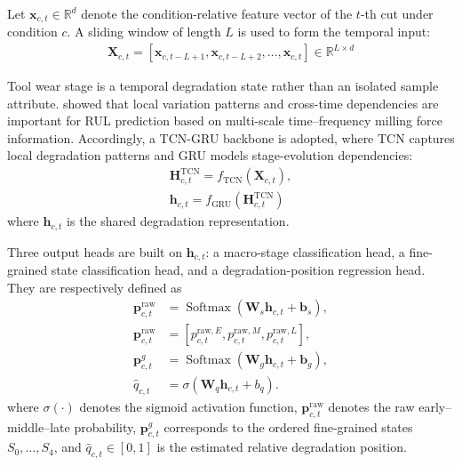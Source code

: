 \documentclass[a4paper,fleqn]{cas-sc}
\begin{document}
  Let $\mathbf{x}_{c,t}\in \mathbb{R}^{d}$ denote the condition-relative feature vector of the $t$-th cut under condition $c$. A sliding window of length $L$ is used to form the temporal input:
  \begin{equation}
    \begin{aligned}
      \mathbf{X}_{c,t}=[\mathbf{x}_{c,t-L+1},\mathbf{x}_{c,t-L+2},\ldots,\mathbf{x}_{c,t}]\in \mathbb{R}^{L\times d}
    \end{aligned}
  \end{equation}
  
  Tool wear stage is a temporal degradation state rather than an isolated sample attribute. \citet{ref21} showed that local variation patterns and cross-time dependencies are important for RUL prediction based on multi-scale time--frequency milling force information. Accordingly, a TCN-GRU backbone is adopted, where TCN captures local degradation patterns and GRU models stage-evolution dependencies:
  \begin{equation}
    \begin{aligned}
      \mathbf{H}_{c,t}^{\mathrm{TCN}}=f_{\mathrm{TCN}}(\mathbf{X}_{c,t}),\\
      \mathbf{h}_{c,t}=f_{\mathrm{GRU}}(\mathbf{H}_{c,t}^{\mathrm{TCN}})
    \end{aligned}
  \end{equation}
  where $\mathbf{h}_{c,t}$ is the shared degradation representation. 
  
  Three output heads are built on $\mathbf{h}_{c,t}$: a macro-stage classification head, a fine-grained state classification head, and a degradation-position regression head. They are respectively defined as
\begin{equation}
	\begin{aligned}
		\mathbf{p}_{c,t}^{\mathrm{raw}}
		&=
		\operatorname{Softmax}(\mathbf{W}_{s}\mathbf{h}_{c,t}+\mathbf{b}_{s}),\\
		\mathbf{p}_{c,t}^{\mathrm{raw}}
		&=
		[p_{c,t}^{\mathrm{raw},E},p_{c,t}^{\mathrm{raw},M},p_{c,t}^{\mathrm{raw},L}],\\
		\mathbf{p}_{c,t}^{g}
		&=
		\operatorname{Softmax}(\mathbf{W}_{g}\mathbf{h}_{c,t}+\mathbf{b}_{g}),\\
		\hat{q}_{c,t}
		&=
		\sigma(\mathbf{W}_{q}\mathbf{h}_{c,t}+b_q).
	\end{aligned}
	\label{eq:multi_task_outputs}
\end{equation}
  where $\sigma(\cdot)$ denotes the sigmoid activation function, $\mathbf{p}_{c,t}^{\mathrm{raw}}$ denotes the raw early--middle--late probability, $\mathbf{p}_{c,t}^{g}$ corresponds to the ordered fine-grained states $S_{0},\ldots,S_{4}$, and $\hat{q}_{c,t}\in [0,1]$ is the estimated relative degradation position.
\end{document}
